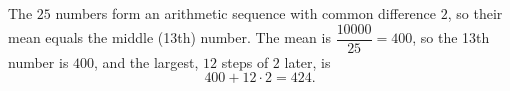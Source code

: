 The $25$ numbers form an arithmetic sequence with common difference $2$, so their mean equals the middle (13th) number. The mean is $\dfrac{10000}{25}=400$, so the 13th number is $400$, and the largest, $12$ steps of $2$ later, is
\[400+12\cdot2=\boxed{424}.\]
